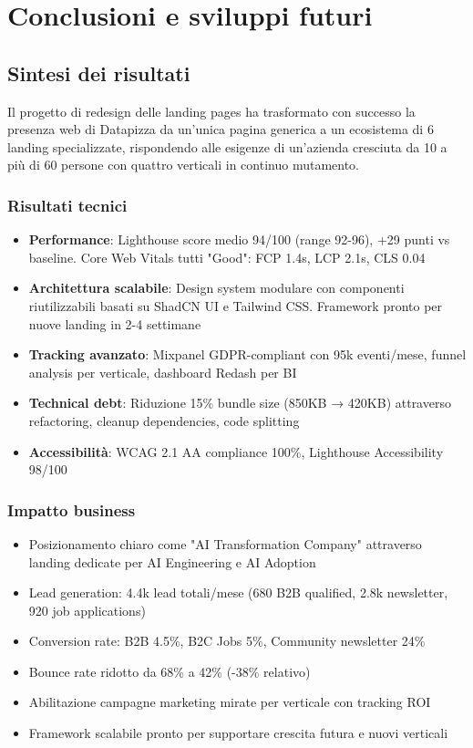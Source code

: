 \chapter{Conclusioni e sviluppi futuri}

\section{Sintesi dei risultati}
Il progetto di redesign delle landing pages ha trasformato con successo 
la presenza web di Datapizza da un'unica pagina generica a un 
ecosistema di 6 landing specializzate, rispondendo alle esigenze di 
un'azienda cresciuta da 10 a più di 60 persone con quattro verticali 
in continuo mutamento.

\subsection{Risultati tecnici}
\begin{itemize}
  \item \textbf{Performance}: Lighthouse score medio 94/100 (range 92-96), 
        +29 punti vs baseline. Core Web Vitals tutti "Good": FCP 1.4s, 
        LCP 2.1s, CLS 0.04
  \item \textbf{Architettura scalabile}: Design system modulare con 
        componenti riutilizzabili basati su ShadCN UI e Tailwind CSS. 
        Framework pronto per nuove landing in 2-4 settimane
  \item \textbf{Tracking avanzato}: Mixpanel GDPR-compliant con 95k 
        eventi/mese, funnel analysis per verticale, dashboard Redash 
        per BI
  \item \textbf{Technical debt}: Riduzione 15\% bundle size (850KB → 
        420KB) attraverso refactoring, cleanup dependencies, code splitting
  \item \textbf{Accessibilità}: WCAG 2.1 AA compliance 100\%, 
        Lighthouse Accessibility 98/100
\end{itemize}

\subsection{Impatto business}
\begin{itemize}
  \item Posizionamento chiaro come "AI Transformation Company" attraverso 
        landing dedicate per AI Engineering e AI Adoption
  \item Lead generation: 4.4k lead totali/mese (680 B2B qualified, 
        2.8k newsletter, 920 job applications)
  \item Conversion rate: B2B 4.5\%, B2C Jobs 5\%, Community newsletter 24\%
  \item Bounce rate ridotto da 68\% a 42\% (-38\% relativo)
  \item Abilitazione campagne marketing mirate per verticale con 
        tracking ROI
  \item Framework scalabile pronto per supportare crescita futura e 
        nuovi verticali
\end{itemize}

